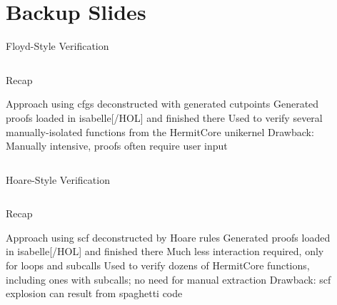 \section{Backup Slides}
\begin{frame}[label=floyd]{Floyd-Style Verification}
  \begin{columns}
    \begin{block}{Recap}
      \begin{outline}
        \1 Approach using \glspl{cfg} deconstructed with generated \alert{cutpoints}
        \1 Generated proofs loaded in \gls{isabelle}[/HOL] and finished there
        \1 Used to verify several manually-isolated functions from \alert{the HermitCore unikernel}
        \1 Drawback: Manually intensive, proofs often require user input
      \end{outline}
    \end{block}

    \begin{example}
    \end{example}
    \hyperlink{contribs}{}
  \end{columns}
\end{frame}

\begin{frame}[label=hoare]{Hoare-Style Verification}
  \begin{columns}
    \begin{block}{Recap}
      \begin{outline}
        \1 Approach using \gls{scf} deconstructed by \alert{Hoare rules}
        \1 Generated proofs loaded in \gls{isabelle}[/HOL] and finished there
        \2 Much less interaction required, only for loops and subcalls
        \1 Used to verify dozens of HermitCore functions, including ones with subcalls; no need for manual extraction
        \1 Drawback: \gls{scf} explosion can result from spaghetti code
      \end{outline}
    \end{block}

    \begin{example}
    \end{example}
    \hyperlink{contribs}{}
  \end{columns}
\end{frame}

